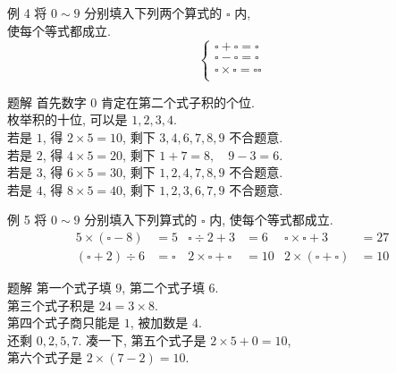 \documentclass[content.tex]{subfiles}
\begin{document}
\begin{frame}{例 4}
将 $0 \sim 9$ 分别填入下列两个算式的 $\square$ 内, \\
使每个等式都成立.
$$
\begin{cases}
\square + \square = \square \\
\square - \square = \square \\
\square \times \square = \square \square \\
\end{cases}
$$
\begin{exampleblock}{题解}
首先数字 $0$ 肯定在第二个式子积的个位. \\
枚举积的十位, 可以是 $1, 2, 3, 4$. \\
若是 $1$, 得 $2 \times 5 = 10$, 剩下 $3,4,6,7,8,9$ 不合题意. \\
若是 $2$, 得 $4 \times 5 = 20$, 剩下 $1+7=8,\quad 9-3=6$. \\
若是 $3$, 得 $6 \times 5 = 30$, 剩下 $1,2,4,7,8,9$ 不合题意. \\
若是 $4$, 得 $8 \times 5 = 40$, 剩下 $1,2,3,6,7,9$ 不合题意. \\
\end{exampleblock}
\end{frame}

\begin{frame}{例 5}
将 $0 \sim 9$ 分别填入下列算式的 $\square$ 内, 
使每个等式都成立.
\begin{align*}
5\times(\square - 8) &= 5 &
\square \div 2 + 3 &= 6 &
\square \times \square + 3 &= 27 \\
(\square + 2) \div 6 &= \square &
2 \times \square + \square &= 10 &
2 \times (\square + \square) &= 10
\end{align*}
\begin{exampleblock}{题解}
第一个式子填 $9$, 第二个式子填 $6$. \\
第三个式子积是 $24 = 3 \times 8$. \\
第四个式子商只能是 $1$, 被加数是 $4$. \\
还剩 $0,2,5,7$. 凑一下, 第五个式子是 $2\times5+0=10$, \\
第六个式子是 $2\times(7 - 2) = 10$.
\end{exampleblock}
\end{frame}
\end{document}
